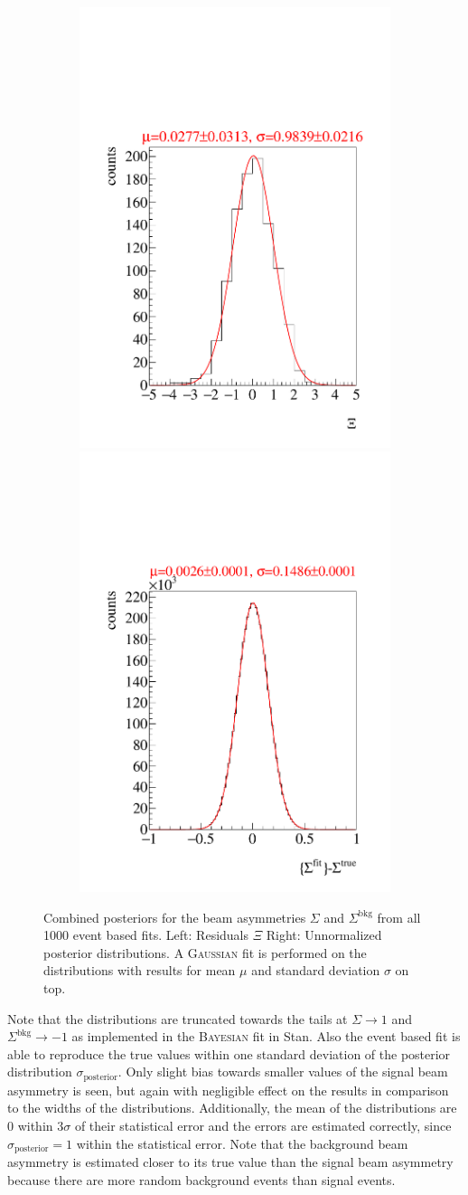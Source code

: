 \begin{figure}[htbp]
\begin{subfigure}{\linewidth}
		\includegraphics[width=.49\linewidth]{../bayes/event_based_fit/plots/combined_post_add_bkg.pdf}
		\includegraphics[width=.49\linewidth]{../bayes/event_based_fit/plots/combined_post_add_raw_bkg.pdf}
	\end{subfigure}
	\caption{Combined posteriors for the beam asymmetries $\Sigma$ and $\Sigma^\text{bkg}$ from all 1000 event based fits. Left: Residuals $\Xi$ Right: Unnormalized posterior distributions. A \textsc{Gaussian} fit is performed on the distributions with results for mean $\mu$ and standard deviation $\sigma$ on top.}
	\label{fig:toyMCposteriors}
\end{figure}
Note that the distributions are truncated towards the tails at $\Sigma\to1$ and $\Sigma^\text{bkg}\to-1$ as implemented in the \textsc{Bayesian} fit in Stan. Also the event based fit is able to reproduce the true values within one standard deviation of the posterior distribution $\sigma_\text{posterior}$. Only slight bias towards smaller values of the signal beam asymmetry is seen, but again with negligible effect on the results in comparison to the widths of the distributions. Additionally, the mean of the distributions are 0 within $3\sigma$ of their statistical error and the errors are estimated correctly, since $\sigma_\text{posterior}=1$ within the statistical error. Note that the background beam asymmetry is estimated closer to its true value than the signal beam asymmetry because there are more random background events than signal events.

